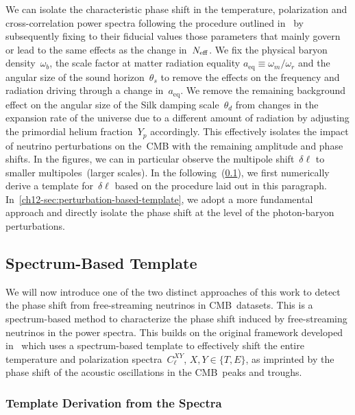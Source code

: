 We can isolate the characteristic phase shift in the temperature, polarization and cross-correlation power spectra following the procedure outlined in~\cite{Follin:2015hya, Wallisch:2018rzj} by subsequently fixing to their fiducial values those parameters that mainly govern or lead to the same effects as the change in~$N_\mathrm{eff}$. We fix the physical baryon density~$\omega_b$, the scale factor at matter radiation equality $a_\mathrm{eq} \equiv \omega_m/\omega_r$ and the angular size of the sound horizon~$\theta_s$ to remove the effects on the frequency and radiation driving through a change in~$a_\mathrm{eq}$. We remove the remaining background effect on the angular size of the Silk damping scale~$\theta_d$ from changes in the expansion rate of the universe due to a different amount of radiation by adjusting the primordial helium fraction~$Y_p$ accordingly. This effectively isolates the impact of neutrino perturbations on the~CMB with the remaining amplitude and phase shifts. In the figures, we can in particular observe the multipole shift~$\delta\ell$ to smaller multipoles~(larger scales). In the following~(\textsection\ref{ch12-sec:spectrum-based-template}), we first numerically derive a template for~$\delta\ell$ based on the procedure laid out in this paragraph. In~\textsection\ref{ch12-sec:perturbation-based-template}, we adopt a more fundamental approach and directly isolate the phase shift at the level of the photon-baryon perturbations.


\subsection{Spectrum-Based Template}
\label{ch12-sec:spectrum-based-template}

We will now introduce one of the two distinct approaches of this work to detect the phase shift from free-streaming neutrinos in CMB~datasets. This is a spectrum-based method to characterize the phase shift induced by free-streaming neutrinos in the power spectra. This builds on the original framework developed in~\cite{Follin:2015hya} which uses a spectrum-based template to effectively shift the entire temperature and polarization spectra~$C_\ell^{XY}$, $X,Y \in \{T, E\}$, as imprinted by the phase shift of the acoustic oscillations in the CMB~peaks and troughs.


\subsubsection{Template Derivation from the Spectra}
\label{ch12-sec:spectrum-template}

